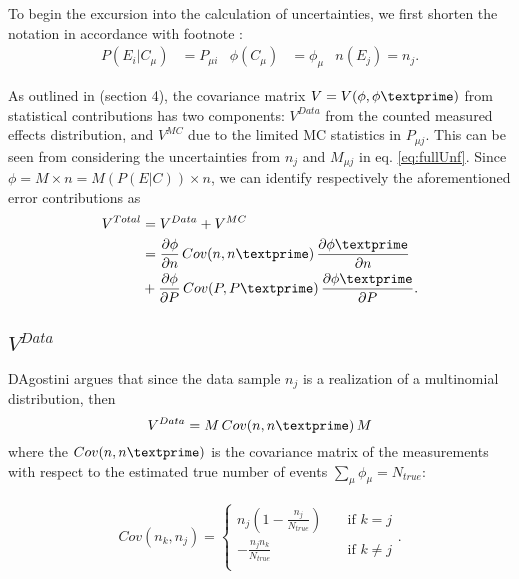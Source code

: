 

To begin the excursion into the calculation of uncertainties, we first shorten the notation in accordance with footnote :
\begin{align*}
	P(E_{i}|C_{\mu}) &= P_{\mu i}
	&
	\phi(C_{\mu}) &= \phi_{\mu}
	&
	n(E_{j}) = n_{j}.
\end{align*}

As outlined in \cite{agostini} (section 4), the covariance matrix $V=V(\phi,\phi\textprime)$ from statistical contributions has two components: $V^{Data}$ from the 
counted measured effects distribution, and $V^{MC}$ due to the limited MC statistics in $P_{\mu j}$.
This can be seen from considering the uncertainties from $n_{j}$ and $M_{\mu j}$ in eq. \ref{eq:fullUnf}.
Since $\phi=M\times n=M(P(E|C))\times n$, we can identify respectively the aforementioned error contributions as
\begin{align*}
  V^{Total} &= V^{Data}+V^{MC} \\
  &= \frac{\partial \phi}{\partial n} \, Cov({n,n\textprime}) \, \frac{\partial \phi\textprime}{\partial n}
  \\
  &
  +\frac{\partial \phi}{\partial P} \, Cov({P,P\textprime}) \, \frac{\partial \phi\textprime}{\partial P}.
\end{align*}

\subsection{$V^{Data}$}
D\textquotesingle Agostini argues that since the data sample $n_{j}$ is a realization of a multinomial distribution,
then
\begin{equation} \label{eq:Vn_agos}
V^{Data} = M \, Cov(n,n\textprime) \, M
\end{equation}
where the $Cov(n,n\textprime)$ is the 
covariance matrix of the measurements with respect to the estimated true number of events $\sum_{\mu}{\phi_{\mu}}=N_{true}$:

\begin{equation}
 \begin{split}
Cov(n_{k},n_{j}) = 
  \begin{cases}
    n_{j}(1-\frac{n_{j}}{N_{true}})       & \quad \text{if } k = j \\
    -\frac{n_{j}n_{k}}{N_{true}}  & \quad \text{if } k \ne j \\
  \end{cases}.
 \end{split}
\end{equation}

